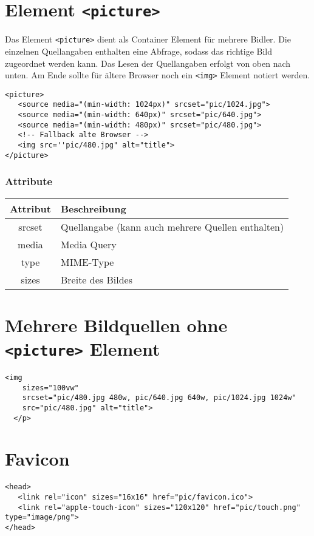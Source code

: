 \section{Element \texttt{<picture>}}
Das Element \texttt{<picture>} dient als Container Element für mehrere Bidler. Die einzelnen Quellangaben enthalten eine Abfrage, sodass das richtige Bild zugeordnet werden kann. Das Lesen der Quellangaben erfolgt von oben nach unten. Am Ende sollte für ältere Browser noch ein \texttt{<img>} Element notiert werden.
\begin{lstlisting}[caption=''picture Beispiel'']
<picture> 
   <source media="(min-width: 1024px)" srcset="pic/1024.jpg">
   <source media="(min-width: 640px)" srcset="pic/640.jpg">
   <source media="(min-width: 480px)" srcset="pic/480.jpg">
   <!-- Fallback alte Browser -->
   <img src=''pic/480.jpg" alt="title">
</picture>
\end{lstlisting}
\subsubsection{Attribute}
\begin{tabular}{|c|l|}
\hline
\rowcolor{lstback}\textbf{Attribut}	&\textbf{Beschreibung}\\
\hline
srcset	&Quellangabe (kann auch mehrere Quellen enthalten)\\
\hline
media	&Media Query\\
\hline
type 		&MIME-Type\\
\hline
sizes		&Breite des Bildes\\
\hline
\end{tabular}
\section{Mehrere Bildquellen ohne \texttt{<picture>} Element}
\begin{lstlisting}[caption=''mehrere Quellen ohne picture Element'']
<img 
    sizes="100vw" 
    srcset="pic/480.jpg 480w, pic/640.jpg 640w, pic/1024.jpg 1024w"
    src="pic/480.jpg" alt="title">
  </p>
\end{lstlisting}
\newpage
\section{Favicon}
\begin{lstlisting}[caption=''Favicon Beispiel'']
<head>
   <link rel="icon" sizes="16x16" href="pic/favicon.ico">
   <link rel="apple-touch-icon" sizes="120x120" href="pic/touch.png" type="image/png">
</head>
\end{lstlisting}
